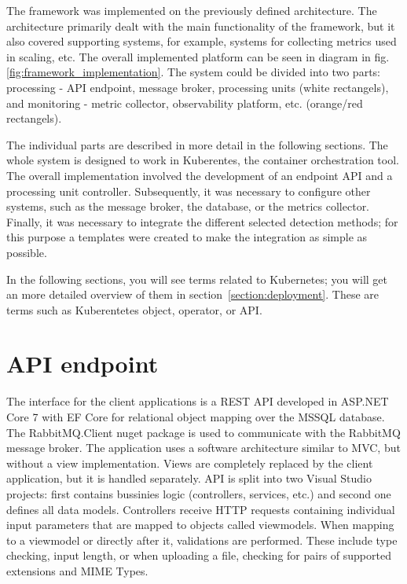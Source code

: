The framework was implemented on the previously defined architecture. The architecture primarily dealt with the main functionality of the framework, but it also covered supporting systems, for example, systems for collecting metrics used in scaling, etc. The overall implemented platform can be seen in diagram in fig. \ref{fig:framework_implementation}. The system could be divided into two parts: processing - API endpoint, message broker, processing units (white rectangels), and monitoring - metric collector, observability platform, etc. (orange/red rectangels).

The individual parts are described in more detail in the following sections. The whole system is designed to work in Kuberentes, the container orchestration tool. The overall implementation involved the development of an endpoint API and a processing unit controller. Subsequently, it was necessary to configure other systems, such as the message broker, the database, or the metrics collector. Finally, it was necessary to integrate the different selected detection methods; for this purpose a templates were created to make the integration as simple as possible.

In the following sections, you will see terms related to Kubernetes; you will get an more detailed overview of them in section~\ref{section:deployment}. These are terms such as Kuberentetes object, operator, or API.

\section{API endpoint}

The interface for the client applications is a REST API developed in ASP.NET Core 7 with EF Core for relational object mapping over the MSSQL database. The RabbitMQ.Client nuget package is used to communicate with the RabbitMQ message broker. The application uses a software architecture similar to MVC, but without a view implementation. Views are completely replaced by the client application, but it is handled separately. API is split into two Visual Studio projects: first contains bussinies logic (controllers, services, etc.) and second one defines all data models. Controllers receive HTTP requests containing individual input parameters that are mapped to objects called viewmodels. When mapping to a viewmodel or directly after it, validations are performed. These include type checking, input length, or when uploading a file, checking for pairs of supported extensions and MIME Types.

